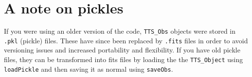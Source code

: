 \documentclass{article}
\newcommand{\edge}{\texttt{EDGE }}
\begin{document}











\section{A note on pickles}
\noindent If you were using an older version of the code, \texttt{TTS\_Obs} objects were stored in \texttt{.pkl} (pickle) files. These have since been replaced by \texttt{.fits} files in order to avoid versioning issues and increased portability and flexibility. If you have old pickle files, they can be transformed into fits files by loading the the \texttt{TTS\_Object} using \texttt{loadPickle} and then saving it as normal using \texttt{saveObs}.
\end{document}
